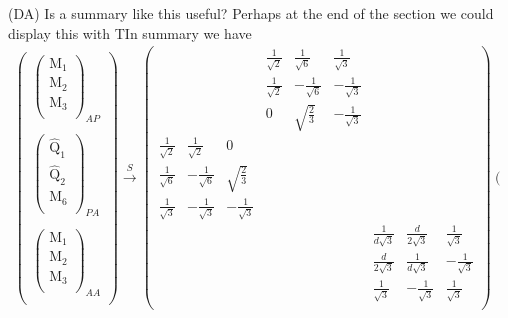 \documentclass[12pt,a4paper]{article}
\newcounter{arrow}
\newcommand{\dave}[1]{{\color{ao(english)}\footnotesize{(DA) #1}}}
\begin{document}
\dave{Is a summary like this useful? Perhaps at the end of the section we could display this with T}In summary we have
\begin{align}
\left(\begin{matrix}
\left( \begin{matrix}
\text{M}_1\\
\text{M}_2\\
\text{M}_3\\
\end{matrix} \right)_{AP} \\
\\
\left( \begin{matrix}
\widehat{\text{Q}}_1\\
\widehat{\text{Q}}_2\\
\text{M}_6\\
\end{matrix} \right)_{PA}\\
\\
\left( \begin{matrix}
\text{M}_1\\
\text{M}_2\\
\text{M}_3\\
\end{matrix} \right)_{AA} \\
\end{matrix} \right)
\xrightarrow{S} \left( \begin{matrix}
&&&			\frac{1}{\sqrt{2}} & \frac{1}{\sqrt{6}} &  \frac{1}{\sqrt{3}} &			&&\\
&&&			\frac{1}{\sqrt{2}} & - \frac{1}{\sqrt{6}} & -\frac{1}{\sqrt{3}}& 			&&\\
&&&			0& \sqrt{\frac{2}{3}} & -\frac{1}{\sqrt{3}}& 			&&\\
\frac{1}{\sqrt{2}}& \frac{1}{\sqrt{2}}& 0&			&&& 			&&\\
\frac{1}{\sqrt{6}} & - \frac{1}{\sqrt{6}} & \sqrt{\frac{2}{3}}&			&&& 			&&\\
\frac{1}{\sqrt{3}} & - \frac{1}{\sqrt{3}} & - \frac{1}{\sqrt{3}}&			&&& 			&&\\
&&&			&&&			\frac{1}{d\sqrt{3}} & \frac{d}{2\sqrt{3}} & \frac{1}{\sqrt{3}}\\
&&&			&&& 			\frac{d}{2\sqrt{3}} & \frac{1}{d\sqrt{3}} & -\frac{1}{\sqrt{3}}\\
&&&			&&& 			\frac{1}{\sqrt{3}} & -\frac{1}{\sqrt{3}} & \frac{1}{\sqrt{3}}\\
\end{matrix} \right)
\left(\begin{matrix}

\end{matrix}
\end{align}
\end{document}
